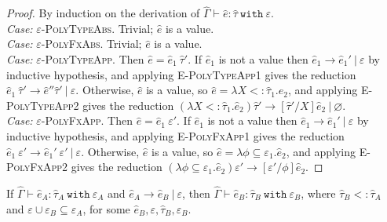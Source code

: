 \documentclass{llncs}
\newcommand{\keywadj}[1]{\mathtt{#1}}
\newcommand{\keyw}[1]{\keywadj{#1}~}
\newcommand{\kw}[1]{\keyw{ #1 }}
\begin{document}
\begin{proof} By induction on the derivation of $\hat \Gamma \vdash \hat e: \hat \tau~\kw{with} \varepsilon$.\\

\textit{Case:} \textsc{$\varepsilon$-PolyTypeAbs}. Trivial; $\hat e$ is a value. \\

\textit{Case:} \textsc{$\varepsilon$-PolyFxAbs}. Trivial; $\hat e$ is a value. \\

\textit{Case:} \textsc{$\varepsilon$-PolyTypeApp}. Then $\hat e= \hat e_1~\hat \tau'$. If $\hat e_1$ is not a value then $\hat e_1 \longrightarrow \hat e_1'~|~\varepsilon$ by inductive hypothesis, and applying \textsc{E-PolyTypeApp1} gives the reduction $\hat e_1~\hat \tau' \longrightarrow \hat e'' \hat \tau'~|~\varepsilon$. Otherwise, $\hat e$ is a value, so $\hat e = \lambda X <: \hat \tau_1. \hat e_2$, and applying \textsc{E-PolyTypeApp2} gives the reduction $(\lambda X <: \hat \tau_1. \hat e_2) \hat \tau' \longrightarrow [\hat \tau'/X]\hat e_2~|~\varnothing$. \\

\textit{Case:} \textsc{$\varepsilon$-PolyFxApp}. Then $\hat e = \hat e_1~\varepsilon'$. If $\hat e_1$ is not a value then $\hat e_1 \longrightarrow \hat e_1'~|~\varepsilon$ by inductive hypothesis, and applying \textsc{E-PolyFxApp1} gives the reduction $\hat e_1~\varepsilon' \longrightarrow \hat e_1'~\varepsilon'~|~\varepsilon$. Otherwise, $\hat e$ is a value, so $\hat e = \lambda \phi \subseteq \varepsilon_1.\hat e_2$, and applying \textsc{E-PolyFxApp2} gives the reduction $(\lambda \phi \subseteq \varepsilon_1.\hat e_2) \varepsilon' \longrightarrow [\varepsilon'/\phi]\hat e_2$.


\end{proof}


\hrulefill

\begin{theorem} [Preservation]
If $\hat \Gamma \vdash \hat e_A: \hat \tau_A~\kw{with} \varepsilon_A$ and $\hat e_A \longrightarrow \hat e_B~|~\varepsilon$, then $\hat \Gamma \vdash \hat e_B: \hat \tau_B~\kw{with} \varepsilon_B$, where $\hat \tau_B <: \hat \tau_A$ and $\varepsilon \cup \varepsilon_B \subseteq \varepsilon_A$, for some $\hat e_B, \varepsilon, \hat \tau_B, \varepsilon_B$.
\end{theorem}
\end{document}
